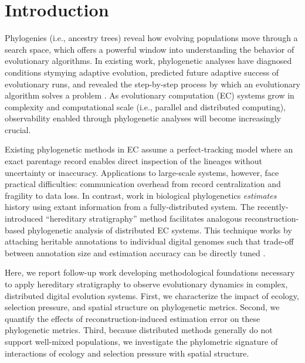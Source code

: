 \vspace{-1.5ex}
\section{Introduction}

Phylogenies (i.e., ancestry trees) reveal how evolving populations move through a search space, which offers a powerful window into understanding the behavior of evolutionary algorithms.
In existing work, phylogenetic analyses have diagnosed conditions stymying adaptive evolution, predicted future adaptive success of evolutionary runs, and revealed the step-by-step process by which an evolutionary algorithm solves a problem \citep{hernandezWhatCanPhylogenetic2022a,shahbandeganUntanglingPhylogeneticDiversity2022a,lalejiniEvolutionaryOriginsPhenotypic2016}.
As evolutionary computation (EC) systems grow in complexity and computational scale (i.e., parallel and distributed computing), observability enabled through phylogenetic analyses will become increasingly crucial.

Existing phylogenetic methods in EC assume a perfect-tracking model where an exact parentage record enables direct inspection of the lineages without uncertainty or inaccuracy.
Applications to large-scale systems, however, face practical difficulties: communication overhead from record centralization and fragility to data loss.
In contrast, work in biological phylogenetics \textit{estimates} history using extant information from a fully-distributed system.
The recently-introduced ``hereditary stratigraphy'' method facilitates analogous reconstruction-based phylogenetic analysis of distributed EC systems.
This technique works by attaching heritable annotations to individual digital genomes such that trade-off between annotation size and estimation accuracy can be directly tuned \citep{moreno2022hereditary}.

Here, we report follow-up work developing methodological foundations necessary to apply hereditary stratigraphy to observe evolutionary dynamics in complex, distributed digital evolution systems.
First, we characterize the impact of ecology, selection pressure, and spatial structure on phylogenetic metrics.
Second, we quantify the effects of reconstruction-induced estimation error on these phylogenetic metrics.
Third, because distributed methods generally do not support well-mixed populations, we investigate the phylometric signature of interactions of ecology and selection pressure with spatial structure.

